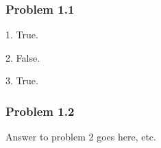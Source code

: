 \documentclass[12pt,letterpaper]{article}
\newcommand\hwnum{1}                  %
\newenvironment{answer}[1]{
  \subsubsection*{Problem \hwnum.#1}
}{\newpage}
\begin{document}
\begin{answer}{1}
1. True.

2. False.

3. True.
\end{answer}

\begin{answer}{2}
Answer to problem 2 goes here, etc.
\end{answer}
\end{document}
